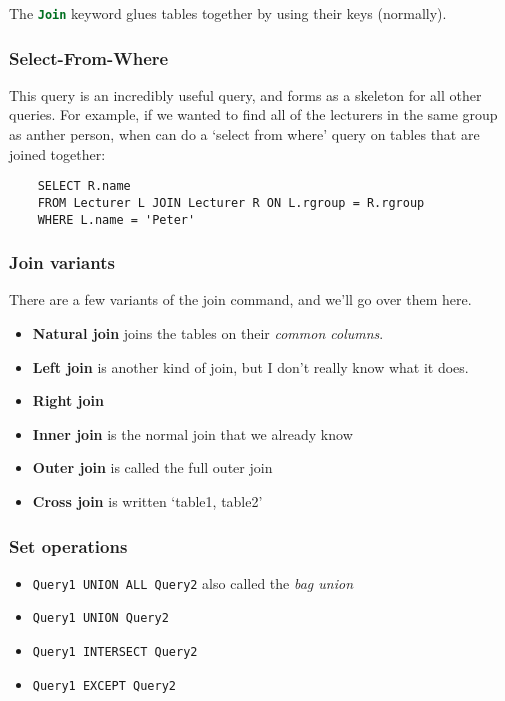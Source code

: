 \documentclass[11pt,a4paper,titlepage,dvipsnames,cmyk]{scrartcl}
\begin{document}
The \lstinline[language=SQL]|Join| keyword glues tables together by using
their keys (normally).

\subsubsection{Select-From-Where}%
\label{ssub:Select-From-Where}
This query is an incredibly useful query, and forms as a skeleton for all
other queries. For example, if we wanted to find all of the lecturers in
the same group as anther person, when can do a `select from where' query
on tables that are joined together:

\begin{lstlisting}
    SELECT R.name
    FROM Lecturer L JOIN Lecturer R ON L.rgroup = R.rgroup
    WHERE L.name = 'Peter'
\end{lstlisting}

\subsubsection{Join variants}%
\label{ssub:variants-join}

There are a few variants of the join command, and we'll go over them here.

\begin{itemize}
    \item \textbf{Natural join} joins the tables on their \textit{common
        columns}.
    \item \textbf{Left join} is another kind of join, but I don't really
        know what it does.
    \item \textbf{Right join}
    \item \textbf{Inner join} is the normal join that we already know
    \item \textbf{Outer join} is called the full outer join
    \item \textbf{Cross join} is written `table1, table2'
\end{itemize}

\subsubsection{Set operations}%
\label{ssub:set-operations}
\begin{itemize}
    \item \lstinline|Query1 UNION ALL Query2| also called the \textit{bag
        union} 
    \item \lstinline|Query1 UNION Query2| 
    \item \lstinline|Query1 INTERSECT Query2| 
    \item \lstinline|Query1 EXCEPT Query2| 
\end{itemize}
\end{document}
